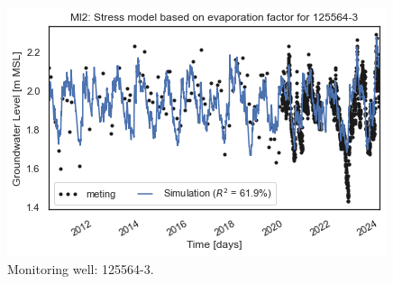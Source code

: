 \begin{figure}[htbp]
\begin{minipage}{0.32\textwidth}
        \includegraphics[width=\linewidth]{frontmatter/Heijplaat-fig/125564-3.png}
        \caption{Monitoring well: 125564-3.}
        \label{SM: 125564-3}
    \end{minipage}
\end{figure}

